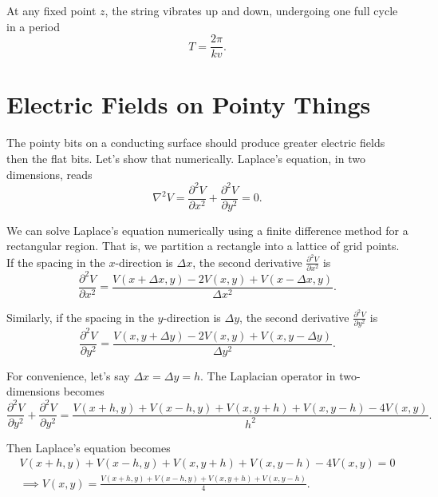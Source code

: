 \documentclass{article}
\begin{document}
At any fixed point $z$, the string vibrates up and down, undergoing one full cycle in a period
\begin{equation*}
    T = \frac{2\pi}{kv}.
\end{equation*}

\section{Electric Fields on Pointy Things}

The pointy bits on a conducting surface should produce greater electric fields then the flat bits. Let's show that numerically. Laplace's equation, in two dimensions, reads
\begin{equation}
    \nabla^2 V = \frac{\partial^2 V}{\partial x^2} + \frac{\partial^2 V}{\partial y^2} = 0.
\end{equation}

We can solve Laplace's equation numerically using a finite difference method for a rectangular region. That is, we partition a rectangle into a lattice of grid points. If the spacing in the $x$-direction is $\Delta x$, the second derivative $\frac{\partial^2 V}{\partial x^2}$ is
\begin{equation}
    \frac{\partial^2 V}{\partial x^2} = \frac{V(x + \Delta x, y) - 2V(x,y) + V(x - \Delta x, y)}{\Delta x^2}.
\end{equation}

Similarly, if the spacing in the $y$-direction is $\Delta y$, the second derivative $\frac{\partial^2 V}{\partial y^2}$ is
\begin{equation}
    \frac{\partial^2 V}{\partial y^2} = \frac{V(x, y + \Delta y) - 2V(x,y) + V(x, y - \Delta y)}{\Delta y^2}.
\end{equation}

For convenience, let's say $\Delta x = \Delta y = h$. The Laplacian operator in two-dimensions becomes
\begin{equation}
    \frac{\partial^2 V}{\partial y^2} + \frac{\partial^2 V}{\partial y^2} = \frac{V(x + h, y) + V(x - h, y) + V(x, y + h) + V(x, y - h) - 4V(x,y)}{h^2}.
\end{equation}

Then Laplace's equation becomes
\begin{gather}
    V(x + h, y) + V(x - h, y) + V(x, y + h) + V(x, y - h) - 4V(x,y) = 0 \\
    \implies \boxed{V(x,y) = \frac{V(x + h, y) + V(x - h, y) + V(x, y + h) + V(x, y - h)}{4}}.
\end{gather}
\end{document}
